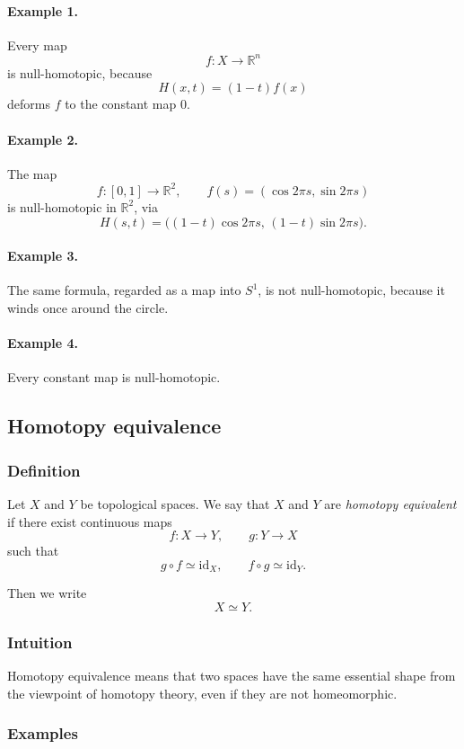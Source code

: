 \documentclass[12pt,a4paper]{article}
\theoremstyle{notespace}
\begin{document}
\paragraph{Example 1.}
Every map
\[
f:X\to \mathbb R^n
\]
is null-homotopic, because
\[
H(x,t)=(1-t)f(x)
\]
deforms \(f\) to the constant map \(0\).

\paragraph{Example 2.}
The map
\[
f:[0,1]\to \mathbb R^2,\qquad f(s)=(\cos 2\pi s,\sin 2\pi s)
\]
is null-homotopic in \(\mathbb R^2\), via
\[
H(s,t)=\big((1-t)\cos 2\pi s,\,(1-t)\sin 2\pi s\big).
\]

\paragraph{Example 3.}
The same formula, regarded as a map into \(S^1\), is not null-homotopic, because it winds once around the circle.

\paragraph{Example 4.}
Every constant map is null-homotopic.

\subsection{Homotopy equivalence}

\subsubsection*{Definition}

Let \(X\) and \(Y\) be topological spaces. We say that \(X\) and \(Y\) are \emph{homotopy equivalent} if there exist continuous maps
\[
f:X\to Y,\qquad g:Y\to X
\]
such that
\[
g\circ f\simeq \mathrm{id}_X,
\qquad
f\circ g\simeq \mathrm{id}_Y.
\]

Then we write
\[
X\simeq Y.
\]

\subsubsection*{Intuition}

Homotopy equivalence means that two spaces have the same essential shape from the viewpoint of homotopy theory, even if they are not homeomorphic.

\subsubsection*{Examples}
\end{document}

